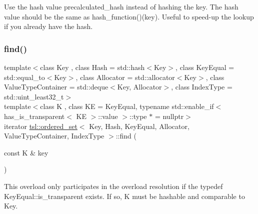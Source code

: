 Use the hash value \textquotesingle{}precalculated\+\_\+hash\textquotesingle{} instead of hashing the key. The hash value should be the same as hash\+\_\+function()(key). Useful to speed-\/up the lookup if you already have the hash. \mbox{\label{classtsl_1_1ordered__set_a46c6728c8839d9bfcec8785a3a918d33}} 
\subsubsection{\texorpdfstring{find()}{find()}\hspace{0.1cm}{\footnotesize\ttfamily [3/6]}}
{\footnotesize\ttfamily template$<$class Key , class Hash  = std\+::hash$<$\+Key$>$, class Key\+Equal  = std\+::equal\+\_\+to$<$\+Key$>$, class Allocator  = std\+::allocator$<$\+Key$>$, class Value\+Type\+Container  = std\+::deque$<$\+Key, Allocator$>$, class Index\+Type  = std\+::uint\+\_\+least32\+\_\+t$>$ \\
template$<$class K , class KE  = Key\+Equal, typename std\+::enable\+\_\+if$<$ has\+\_\+is\+\_\+transparent$<$ K\+E $>$\+::value $>$\+::type $\ast$  = nullptr$>$ \\
iterator \mbox{\hyperlink{classtsl_1_1ordered__set}{tsl\+::ordered\+\_\+set}}$<$ Key, Hash, Key\+Equal, Allocator, Value\+Type\+Container, Index\+Type $>$\+::find (\begin{DoxyParamCaption}\item[{const K \&}]{key }\end{DoxyParamCaption})\hspace{0.3cm}{\ttfamily [inline]}}

This overload only participates in the overload resolution if the typedef Key\+Equal\+::is\+\_\+transparent exists. If so, K must be hashable and comparable to Key. \mbox{\label{classtsl_1_1ordered__set_aced9be09be40ecc1b2b53148fdbeae3c}} 
